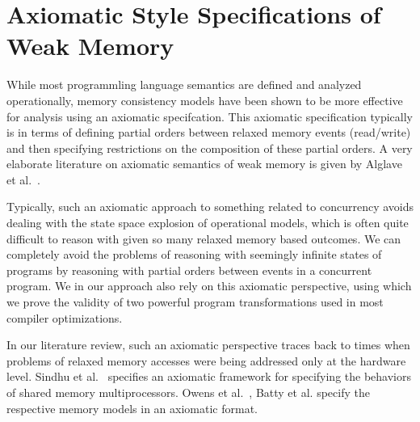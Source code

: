 \section{Axiomatic Style Specifications of Weak Memory}

While most programmling language semantics are defined and analyzed operationally, memory consistency models have been shown to be more effective for analysis using an axiomatic specifcation.
This axiomatic specification typically is in terms of defining partial orders between relaxed memory events (read/write) and then specifying restrictions on the composition of these partial orders. A very elaborate literature on axiomatic semantics of weak memory is given by Alglave et al.~\cite{Alglave}.

Typically, such an axiomatic approach to something related to concurrency avoids dealing with the state space explosion of operational models, which is often quite difficult to reason with given so many relaxed memory based outcomes. 
We can completely avoid the problems of reasoning with seemingly infinite states of programs by reasoning with partial orders between events in a concurrent program.
We in our approach also rely on this axiomatic perspective, using which we prove the validity of two powerful program transformations used in most compiler optimizations. 

In our literature review, such an axiomatic perspective traces back to times when problems of relaxed memory accesses were being addressed only at the hardware level. 
Sindhu et al.~\cite{Sindhu} specifies an axiomatic framework for specifying the behaviors of shared memory multiprocessors. 
Owens et al.~\cite{OwensS}, Batty et al.\cite{BattyM} specify the respective memory models in an axiomatic format. 



